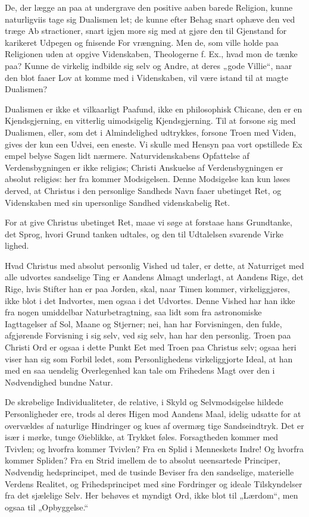 \documentclass[12pt]{book}
\newcommand{\opage}[1]{\marginnote{\footnotesize\textit{[#1]}}}
\begin{document}
De, der lægge an paa at undergrave den positive aaben\-%
barede Religion, kunne naturligviis tage sig Dualismen let;
de kunne efter Behag snart ophæve den ved træge Ab\-%
\opage{204}\setcounter{footnote}{0}%
stractioner, snart igjen more sig med at gjøre den til
Gjenstand for karikeret Udpegen og fnisende For\-%
vrængning. Men de, som ville holde paa Religionen uden
at opgive Videnskaben, Theologerne f. Ex., hvad mon
de tænke paa? Kunne de virkelig indbilde sig selv og
Andre, at deres „gode Villie“, naar den blot faaer Lov
at komme med i Videnskaben, vil være istand til at
magte Dualismen?

Dualismen er ikke et vilkaarligt Paafund, ikke en
philosophisk Chicane, den er en Kjendsgjerning, en
vitterlig uimodsigelig Kjendsgjerning. Til at forsone sig
med Dualismen, eller, som det i Almindelighed udtrykkes,
forsone Troen med Viden, gives der kun een Udvei, een
eneste. Vi skulle med Hensyn paa vort opstillede Ex\-%
empel belyse Sagen lidt nærmere. Naturvidenskabens
Opfattelse af Verdensbygningen er ikke religiøs; Christi
Anskuelse af Verdensbygningen er absolut religiøs: her\-%
fra kommer Modsigelsen. Denne Modsigelse kan kun
løses derved, at Christus i den personlige Sandheds
Navn faaer ubetinget Ret, og Videnskaben med sin
upersonlige Sandhed videnskabelig Ret.

For at give Christus ubetinget Ret, maae vi søge
at forstaae hans Grundtanke, det Sprog, hvori Grund\-%
tanken udtales, og den til Udtalelsen svarende Virke\-%
lighed.

Hvad Christus med absolut personlig Vished ud\-%
taler, er dette, at Naturriget med alle udvortes sandselige
Ting er Aandens Almagt underlagt, at Aandens Rige,
det Rige, hvis Stifter han er paa Jorden, skal, naar
Timen kommer, virkeliggjøres, ikke blot i det Indvortes,
men ogsaa i det Udvortes. Denne Vished har han ikke
fra nogen umiddelbar Naturbetragtning, saa lidt som fra
astronomiske Iagttagelser af Sol, Maane og Stjerner; nei,
han har Forvisningen, den fulde, afgjørende Forvisning
\opage{205}\setcounter{footnote}{0}%
i sig selv, ved sig selv, han har den personlig. Troen
paa Christi Ord er ogsaa i dette Punkt Eet med Troen
paa Christus selv; ogsaa heri viser han sig som Forbil\-%
ledet, som Personlighedens virkeliggjorte Ideal, at han
med en saa uendelig Overlegenhed kan tale om Frihedens
Magt over den i Nødvendighed bundne Natur.

De skrøbelige Individualiteter, de relative, i Skyld
og Selvmodsigelse hildede Personligheder ere, trods al
deres Higen mod Aandens Maal, idelig udsatte for at
overvældes af naturlige Hindringer og kues af overmæg\-%
tige Sandseindtryk. Det er især i mørke, tunge Øieblikke,
at Trykket føles. Forsagtheden kommer med Tvivlen;
og hvorfra kommer Tvivlen? Fra en Splid i Menneskets
Indre! Og hvorfra kommer Spliden? Fra en Strid
imellem de to absolut ueensartede Principer, Nødvendig\-%
hedsprincipet, med de tusinde Beviser fra den sandselige,
materielle Verdens Realitet, og Frihedsprincipet med sine
Fordringer og ideale Tilskyndelser fra det sjælelige Selv.
Her behøves et myndigt Ord, ikke blot til „Lærdom“,
men ogsaa til „Opbyggelse.“
\end{document}
